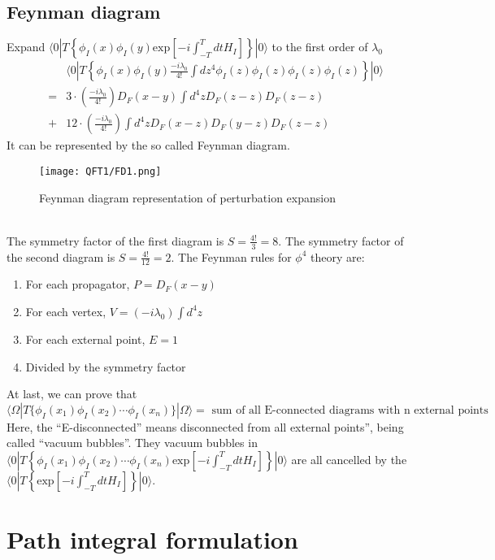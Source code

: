 \subsection{Feynman diagram}
Expand $\langle 0 | T \left\{ \phi_I(x) \phi_I(y) \mathrm{exp} \left[ -i \int_{-T}^{T} dt H_I \right]\right\} | 0 \rangle$ to the first order of $\lambda_0$
\begin{eqnarray}
& &\langle 0 | T \left\{ \phi_I(x) \phi_I(y) \frac{-i\lambda_0}{4!} \int dz^4 \phi_I(z) \phi_I(z) \phi_I(z) \phi_I(z) \right\} | 0 \rangle \nonumber \\
&=& 3 \cdot (\frac{-i\lambda_0}{4!}) D_F(x-y) \int d^4 z D_F(z-z) D_F(z-z) \nonumber \\
&+& 12 \cdot (\frac{-i\lambda_0}{4!}) \int d^4 z  D_F(x-z) D_F(y-z) D_F(z-z) \nonumber
\end{eqnarray}
It can be represented by the so called Feynman diagram.
\begin{figure}[!h]
\centering
\texttt{[image: QFT1/FD1.png]}
\caption{Feynman diagram representation of perturbation expansion}
\end{figure}
\\
The symmetry factor of the first diagram is $S = \frac{4!}{3} = 8$.
The symmetry factor of the second diagram is $S = \frac{4!}{12} = 2$.
The Feynman rules for $\phi^4$ theory are:
\begin{enumerate}
\item For each propagator, $P = D_F(x-y)$
\item For each vertex, $V = (-i\lambda_0)\int d^4z$
\item For each external point, $E=1$
\item Divided by the symmetry factor
\end{enumerate}
At last, we can prove that
\[\langle \Omega | T \{ \phi_I(x_1) \phi_I(x_2) \cdots \phi_I(x_n) \} | \Omega \rangle = \mbox{ sum of all E-connected diagrams with n external points}\]
Here, the ``E-disconnected'' means disconnected from all external points'', being called ``vacuum bubbles''. They vacuum bubbles in $\langle 0 | T \left\{ \phi_I(x_1) \phi_I(x_2) \cdots \phi_I(x_n) \mathrm{exp} \left[ -i \int_{-T}^{T} dt H_I \right]\right\} | 0 \rangle$ are all cancelled by the $\langle 0 | T \left\{ \mathrm{exp} \left[ -i \int_{-T}^{T} dt H_I \right]\right\} | 0 \rangle$.

\section{Path integral formulation}
